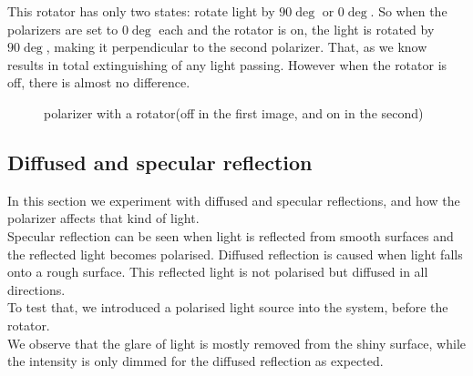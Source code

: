 \documentclass[english]{article}
\begin{document}
This rotator has only two states: rotate light by $90\deg$ or $0\deg$. 
So when the polarizers are set to $0\deg$ each and the rotator is on, the light is rotated by $90\deg$, making it perpendicular to the second polarizer. 
That, as we know results in total extinguishing of any light passing. 
However when the rotator is off, there is almost no difference.\\
\begin{figure}[H]
	\centering
	\caption{polarizer with a rotator(off in the first image, and on in the second)}
	\label{fig:seven}
\end{figure}

\subsection{Diffused and specular reflection}
In this section we experiment with diffused and specular reflections, and how the polarizer affects that kind of light.\\
Specular reflection can be seen when light is reflected from smooth surfaces and the reflected light becomes polarised.
Diffused reflection is caused when light falls onto a rough surface. 
This reflected light is not polarised but diffused in all directions.\\
To test that, we introduced a polarised light source into the system, before the rotator. \\
We observe that the glare of light is mostly removed from the shiny surface, while the intensity is only dimmed for the diffused reflection as expected.\\
\end{document}
